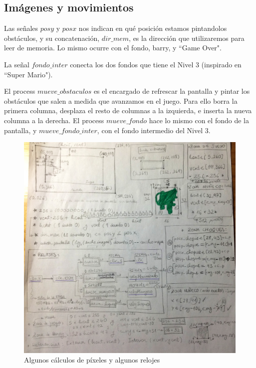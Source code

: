 \documentclass[11pt, a4paper, spanish, openright, twoside]{book}
\begin{document}
\subsection{Imágenes y movimientos}

Las señales $posy$ y $posx$ nos indican en qué posición estamos pintandolos obstáculos, y su concatenación, $dir\_mem$, es la dirección que utilizaremos para leer de memoria. Lo mismo ocurre con el fondo, barry, y ``Game Over".

La señal $fondo\_inter$ conecta los dos fondos que tiene el Nivel 3 (inspirado en ``Super Mario").

El process $mueve\_obstaculos$ es el encargado de refrescar la pantalla y pintar los obstáculos que salen a medida que avanzamos en el juego. Para ello borra la primera columna, desplaza el resto de columnas a la izquierda, e inserta la nueva columna a la derecha. El process $mueve\_fondo$ hace lo mismo con el fondo de la pantalla, y $mueve\_fondo\_inter$, con el fondo intermedio del Nivel 3.

	\begin{figure}[!h]
		\centering
		\includegraphics[scale=0.2]{calculos.jpg}
		\caption{Algunos cálculos de píxeles y algunos relojes}
	\end{figure}
	
\end{document}
